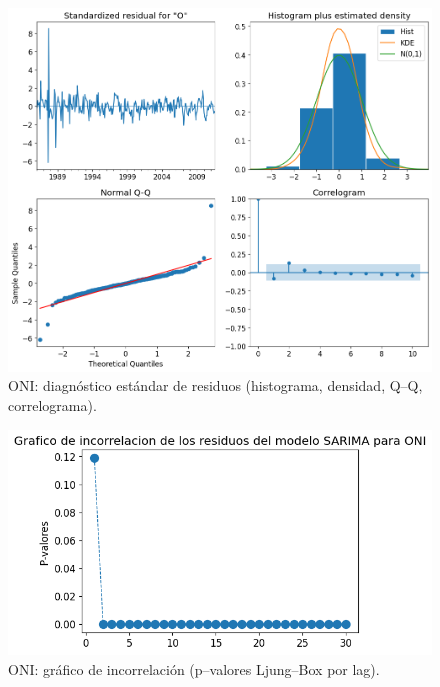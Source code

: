 \begin{figure}[H]\centering
\includegraphics[scale=.52]{Figures/res_std_oni.png}
\caption{ONI: diagnóstico estándar de residuos (histograma, densidad, Q--Q, correlograma).}
\label{fig:std_oni}
\end{figure}

\begin{figure}[H]\centering
\includegraphics[scale=.52]{Figures/inco_oni.png}
\caption{ONI: gráfico de incorrelación (p--valores Ljung--Box por lag).}
\label{fig:inco_oni}
\end{figure}


